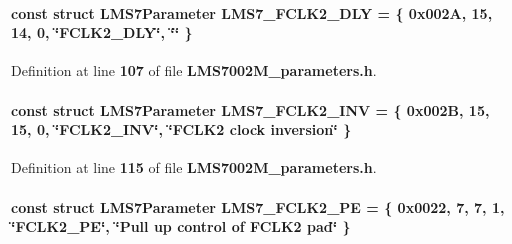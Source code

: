\paragraph[{L\+M\+S7\+\_\+\+F\+C\+L\+K2\+\_\+\+D\+LY}]{\setlength{\rightskip}{0pt plus 5cm}const struct {\bf L\+M\+S7\+Parameter} L\+M\+S7\+\_\+\+F\+C\+L\+K2\+\_\+\+D\+LY = \{ 0x002\+A, 15, 14, 0, \char`\"{}\+F\+C\+L\+K2\+\_\+\+D\+L\+Y\char`\"{}, \char`\"{}\char`\"{} \}\hspace{0.3cm}{\ttfamily [static]}}\label{LMS7002M__parameters_8h_a1b1ea594e1992d4c36ca40421e6678ce}


Definition at line {\bf 107} of file {\bf L\+M\+S7002\+M\+\_\+parameters.\+h}.

\paragraph[{L\+M\+S7\+\_\+\+F\+C\+L\+K2\+\_\+\+I\+NV}]{\setlength{\rightskip}{0pt plus 5cm}const struct {\bf L\+M\+S7\+Parameter} L\+M\+S7\+\_\+\+F\+C\+L\+K2\+\_\+\+I\+NV = \{ 0x002\+B, 15, 15, 0, \char`\"{}\+F\+C\+L\+K2\+\_\+\+I\+N\+V\char`\"{}, \char`\"{}\+F\+C\+L\+K2 clock inversion\char`\"{} \}\hspace{0.3cm}{\ttfamily [static]}}\label{LMS7002M__parameters_8h_a87d25a5947054a29fc111d0b98fa07d1}


Definition at line {\bf 115} of file {\bf L\+M\+S7002\+M\+\_\+parameters.\+h}.

\paragraph[{L\+M\+S7\+\_\+\+F\+C\+L\+K2\+\_\+\+PE}]{\setlength{\rightskip}{0pt plus 5cm}const struct {\bf L\+M\+S7\+Parameter} L\+M\+S7\+\_\+\+F\+C\+L\+K2\+\_\+\+PE = \{ 0x0022, 7, 7, 1, \char`\"{}\+F\+C\+L\+K2\+\_\+\+P\+E\char`\"{}, \char`\"{}\+Pull up control of F\+C\+L\+K2 pad\char`\"{} \}\hspace{0.3cm}{\ttfamily [static]}}\label{LMS7002M__parameters_8h_aaa2ec3fd681417585c5f79128cf13230}


